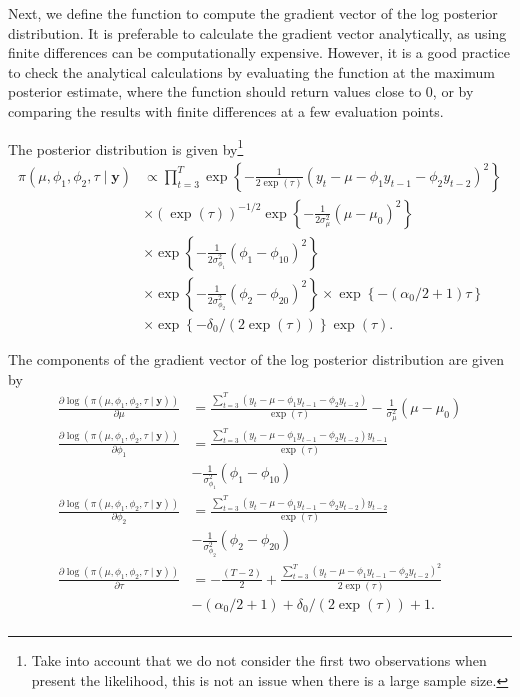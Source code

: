 Next, we define the function to compute the gradient vector of the log posterior distribution. It is preferable to calculate the gradient vector analytically, as using finite differences can be computationally expensive. However, it is a good practice to check the analytical calculations by evaluating the function at the maximum posterior estimate, where the function should return values close to 0, or by comparing the results with finite differences at a few evaluation points.

The posterior distribution is given by\footnote{Take into account that we do not consider the first two observations when present the likelihood, this is not an issue when there is a large sample size.}
\begin{align*}
	\pi(\mu,\phi_1,\phi_2,\tau\mid \bm{y})&\propto \prod_{t=3}^T\exp\left\{-\frac{1}{2\exp(\tau)}(y_t-\mu-\phi_1y_{t-1}-\phi_2y_{t-2})^2\right\}\\
	&\times(\exp(\tau))^{-1/2}\exp\left\{-\frac{1}{2\sigma^2_{\mu}}(\mu-\mu_0)^2\right\}\\
	&\times\exp\left\{-\frac{1}{2\sigma^2_{\phi_1}}(\phi_1-\phi_{10})^2\right\}\\
	&\times\exp\left\{-\frac{1}{2\sigma^2_{\phi_2}}(\phi_2-\phi_{20})^2\right\}\times\exp\left\{-(\alpha_0/2+1)\tau\right\}\\
	&\times \exp\left\{-\delta_0/(2\exp(\tau))\right\}\exp(\tau).
\end{align*} 

The components of the gradient vector of the log posterior distribution are given by
\begin{align*}
	\frac{\partial \log(\pi(\mu,\phi_1,\phi_2,\tau\mid \bm{y}))}{\partial\mu}&=\frac{\sum_{t=3}^T(y_t-\mu-\phi_1y_{t-1}-\phi_2y_{t-2})}{\exp(\tau)}-\frac{1}{\sigma_{\mu}^2}(\mu-\mu_0)\\
	\frac{\partial\log(\pi(\mu,\phi_1,\phi_2,\tau\mid \bm{y}))}{\partial\phi_1}&=\frac{\sum_{t=3}^T(y_t-\mu-\phi_1y_{t-1}-\phi_2y_{t-2})y_{t-1}}{\exp(\tau)}\\
	&-\frac{1}{\sigma_{\phi_1}^2}(\phi_1-\phi_{10})\\
	\frac{\partial\log(\pi(\mu,\phi_1,\phi_2,\tau\mid \bm{y}))}{\partial\phi_2}&=\frac{\sum_{t=3}^T(y_t-\mu-\phi_1y_{t-1}-\phi_2y_{t-2})y_{t-2}}{\exp(\tau)}\\
	&-\frac{1}{\sigma_{\phi_2}^2}(\phi_2-\phi_{20})\\	\frac{\partial\log(\pi(\mu,\phi_1,\phi_2,\tau\mid \bm{y}))}{\partial\tau}&=-\frac{(T-2)}{2}+\frac{\sum_{t=3}^T(y_t-\mu-\phi_1y_{t-1}-\phi_2y_{t-2})^2}{2\exp(\tau)}\\
	&-(\alpha_0/2+1)+\delta_0/(2\exp(\tau))+1.\\
\end{align*}

